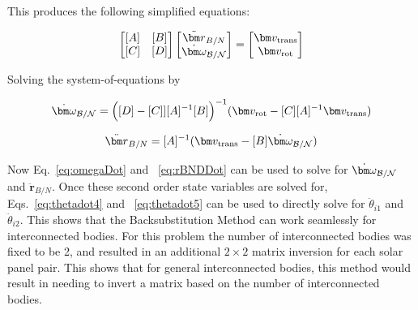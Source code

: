 This produces the following simplified equations:

\begin{equation}
	\begin{bmatrix}
		[A] & [B]\\
		[C] & [D]
	\end{bmatrix} \begin{bmatrix}
		\ddot{\bm r}_{B/N}\\
		\dot{\bm\omega}_{\cal B/N}
	\end{bmatrix} = \begin{bmatrix}
		\bm v_{\text{trans}}\\
		\bm v_{\text{rot}}
	\end{bmatrix}
\end{equation}

Solving the system-of-equations by

\begin{equation}
	\dot{\bm\omega}_{\cal B/N} = \Big([D] - [C]][A]^{-1}[B]\Big)^{-1}(\bm v_{\text{rot}} - [C][A]^{-1}\bm v_{\text{trans}})
	\label{eq:omegaDot}
\end{equation}

\begin{equation}
	\ddot{\bm r}_{B/N} = [A]^{-1} (\bm v_{\text{trans}} - [B]\dot{\bm\omega}_{\cal B/N})
	\label{eq:rBNDDot}
\end{equation}

Now Eq.~\eqref{eq:omegaDot} and ~\eqref{eq:rBNDDot} can be used to solve for $\dot{\bm\omega}_{\cal B/N}$ and $\ddot{\bm r}_{B/N}$. Once these second order state variables are solved for, Eqs.~\eqref{eq:thetadot4} and ~\eqref{eq:thetadot5} can be used to directly solve for $\ddot \theta_{i1}$ and $\ddot \theta_{i2}$. This shows that the Backsubstitution Method can work seamlessly for interconnected bodies. For this problem the number of interconnected bodies was fixed to be 2, and resulted in an additional $2\times 2$ matrix inversion for each solar panel pair. This shows that for general interconnected bodies, this method would result in needing to invert a matrix based on the number of interconnected bodies.
